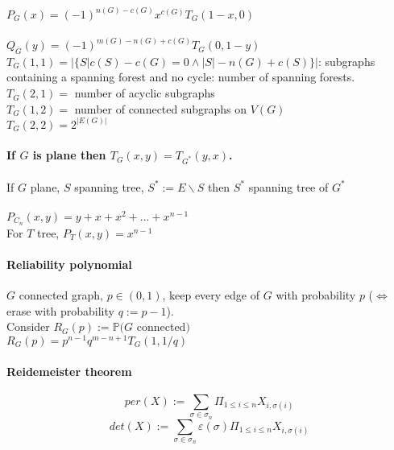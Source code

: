 \documentclass[12pt]{article}
\begin{document}
\paragraph{$P_G(x) = (-1)^{n(G)-c(G)} x^{c(G)} T_G(1-x, 0)$\\}
$Q_G(y) = (-1)^{m(G)-n(G)+c(G)} T_G(0,1-y)$\\
$T_G(1,1) = |\{S | c(S) - c(G) = 0 \wedge |S| - n(G) + c(S)\}|$: subgraphs  containing a spanning forest and no cycle: number of spanning forests.\\
$T_G(2,1) =$ number of acyclic subgraphs\\
$T_G(1,2) =$ number of connected subgraphs on $V(G)$\\
$T_G(2,2) = 2^{|E(G)|}$\\

\paragraph{If $G$ is plane then $T_G(x,y) = T_{G^*}(y,x)$.\\}
If $G$ plane, $S$ spanning tree, $S^* := E \backslash S$ then $S^*$ spanning tree of $G^*$\\\\

$P_{C_n}(x,y) = y + x + x^2 + ... + x^{n-1}$\\
For $T$ tree, $P_T(x,y) = x^{n-1}$\\

\paragraph{Reliability polynomial\\}
$G$ connected graph, $p \in (0,1)$, keep every edge of $G$ with probability $p$ ($\Leftrightarrow$ erase with probability $q := p-1$).\\
Consider $R_G(p) := \mathbb{P}(G$ connected$)$\\
$R_G(p) = p^{n-1} q^{m-n+1} T_G(1,1/q)$\\

\paragraph{Reidemeister theorem\\}


\[ per(X) := \sum_{\sigma \in \sigma_n} \Pi_{1 \leqslant i \leqslant n} X_{i,\sigma(i)} \]
\[ det(X) := \sum_{\sigma \in \sigma_n} \varepsilon(\sigma) \Pi_{1 \leqslant i \leqslant n} X_{i,\sigma(i)} \]
\end{document}
